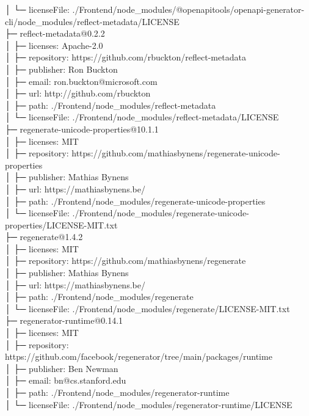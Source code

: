 │  └─ licenseFile: ./Frontend/node\_modules/@openapitools/openapi-generator-cli/node\_modules/reflect-metadata/LICENSE\\
├─ reflect-metadata@0.2.2\\
│  ├─ licenses: Apache-2.0\\
│  ├─ repository: https://github.com/rbuckton/reflect-metadata\\
│  ├─ publisher: Ron Buckton\\
│  ├─ email: ron.buckton@microsoft.com\\
│  ├─ url: http://github.com/rbuckton\\
│  ├─ path: ./Frontend/node\_modules/reflect-metadata\\
│  └─ licenseFile: ./Frontend/node\_modules/reflect-metadata/LICENSE\\
├─ regenerate-unicode-properties@10.1.1\\
│  ├─ licenses: MIT\\
│  ├─ repository: https://github.com/mathiasbynens/regenerate-unicode-properties\\
│  ├─ publisher: Mathias Bynens\\
│  ├─ url: https://mathiasbynens.be/\\
│  ├─ path: ./Frontend/node\_modules/regenerate-unicode-properties\\
│  └─ licenseFile: ./Frontend/node\_modules/regenerate-unicode-properties/LICENSE-MIT.txt\\
├─ regenerate@1.4.2\\
│  ├─ licenses: MIT\\
│  ├─ repository: https://github.com/mathiasbynens/regenerate\\
│  ├─ publisher: Mathias Bynens\\
│  ├─ url: https://mathiasbynens.be/\\
│  ├─ path: ./Frontend/node\_modules/regenerate\\
│  └─ licenseFile: ./Frontend/node\_modules/regenerate/LICENSE-MIT.txt\\
├─ regenerator-runtime@0.14.1\\
│  ├─ licenses: MIT\\
│  ├─ repository: https://github.com/facebook/regenerator/tree/main/packages/runtime\\
│  ├─ publisher: Ben Newman\\
│  ├─ email: bn@cs.stanford.edu\\
│  ├─ path: ./Frontend/node\_modules/regenerator-runtime\\
│  └─ licenseFile: ./Frontend/node\_modules/regenerator-runtime/LICENSE\\
